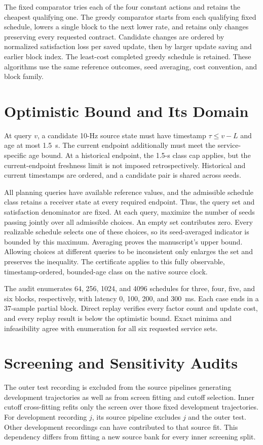 \documentclass[journal]{IEEEtran}
\begin{document}
The fixed comparator tries each of the four constant actions and retains
the cheapest qualifying one. The greedy comparator starts from each
qualifying fixed schedule, lowers a single block to the next lower rate,
and retains only changes preserving every requested contract. Candidate
changes are ordered by normalized satisfaction loss per saved update,
then by larger update saving and earlier block index. The least-cost
completed greedy schedule is retained. These algorithms use the same
reference outcomes, seed averaging, cost convention, and block family.

\section{Optimistic Bound and Its Domain}
At query $v$, a candidate 10-Hz source state must have timestamp
$\tau\leq v-L$ and age at most 1.5~s. The current endpoint additionally
must meet the service-specific age bound. At a historical endpoint,
the 1.5-s class cap applies, but the current-endpoint freshness limit
is not imposed retrospectively. Historical and current timestamps
are ordered, and a candidate pair is shared across seeds.

All planning queries have available reference values, and the admissible
schedule class retains a receiver state at every required endpoint.
Thus, the query set and satisfaction denominator are fixed. At each query,
maximize the number of seeds passing jointly over all admissible choices.
An empty set contributes zero. Every realizable schedule selects one of
these choices, so its seed-averaged indicator is bounded by this maximum.
Averaging proves the manuscript's upper bound. Allowing choices at
different queries to be inconsistent only enlarges the set and preserves
the inequality. The certificate applies to this fully observable,
timestamp-ordered, bounded-age class on the native source clock.

The audit enumerates 64, 256, 1024, and 4096 schedules for three, four,
five, and six blocks, respectively, with latency 0, 100, 200, and 300~ms.
Each case ends in a 37-sample partial block. Direct replay verifies every
factor count and update cost, and every replay result is below the
optimistic bound. Exact minima and infeasibility agree with enumeration
for all six requested service sets.

\section{Screening and Sensitivity Audits}
The outer test recording is excluded from the source pipelines generating
development trajectories as well as from screen fitting and cutoff
selection. Inner cutoff cross-fitting refits only the screen over those
fixed development trajectories. For development recording $j$, its source
pipeline excludes $j$ and the outer test. Other development recordings can
have contributed to that source fit. This dependency differs from fitting
a new source bank for every inner screening split.
\end{document}
